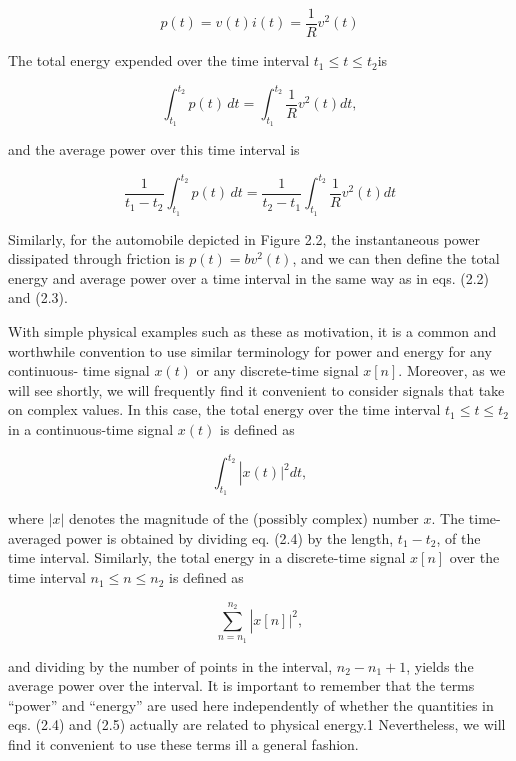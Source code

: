 \documentclass{report}
\begin{document}
\begin{equation}
p(t)=v(t)i(t)=\frac{1}{R}v^2(t)
\end{equation}

The total energy expended over the time interval \(t_1\leq t\leq t_2\)is

\begin{equation}
\int_{t_1}^{t_2} p(t) \, dt=\int _{t_1}^{t_2}\frac{1}{R}v^2(t)dt,
\end{equation}

and the average power over this time interval is

\begin{equation}
\frac{1}{t_1-t_2}\int_{t_1}^{t_2} p(t) \, dt=\frac{1}{t_2-t_1}\int _{t_1}^{t_2}\frac{1}{R}v^2(t)dt
\end{equation}

Similarly, for the automobile depicted in Figure 2.2, the instantaneous power dissipated through friction is \(p(t) = b v^2(t)\), and we can then
define the total energy and average power over a time interval in the same way as in eqs. (2.2) and (2.3).

With simple physical examples such as these as motivation, it is a common and worthwhile convention to use similar terminology for power and energy
for any continuous- time signal \(x(t)\) or any discrete-time signal \(x[n]\). Moreover, as we will see shortly, we will frequently find it convenient
to consider signals that take on complex values. In this case, the total energy over the time interval \(t_1\leq t\leq t_2\) in a continuous-time
signal \(x(t)\) is defined as

\begin{equation}
\int _{t_1}^{t_2}\left|x(t)|^2dt\right.,
\end{equation}

where \(|x|\) denotes the magnitude of the (possibly complex) number \(x\). The time-averaged power is obtained by dividing eq. (2.4) by the length,
\(t_1 - t_2\), of the time interval. Similarly, the total energy in a discrete-time signal \(x[n]\) over the time interval \(n_1\leq n\leq n_2\)
is defined as

\begin{equation}
\sum _{n=n_1}^{n_2} \left|x[n]|^2\right.,
\end{equation}

and dividing by the number of points in the interval, \(n_2-n_1+1\), yields the average power over the interval. It is important to remember that
the terms {``}power{''} and {``}energy{''} are used here independently of whether the quantities in eqs. (2.4) and (2.5) actually are related to
physical energy.1 Nevertheless, we will find it convenient to use these terms ill a general fashion.
\end{document}
